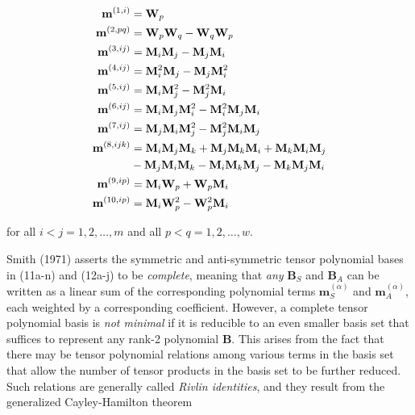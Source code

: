 %
\begin{subequations}
\begin{align}
	\label{E:29}
		\mathbf{m}^{(1,i)}  &= \mathbf{W}_p \\ 
		\mathbf{m}^{(2,pq)} &= \mathbf{W}_p \mathbf{W}_q - \mathbf{W}_q \mathbf{W}_p \\ 
		\mathbf{m}^{(3,ij)} &= \mathbf{M}_i \mathbf{M}_j - \mathbf{M}_j \mathbf{M}_i \\ 
		\mathbf{m}^{(4,ij)} &= \mathbf{M}^2_i \mathbf{M}_j - \mathbf{M}_j \mathbf{M}^2_i \\
		\mathbf{m}^{(5,ij)} &= \mathbf{M}_i \mathbf{M}^2_j - \mathbf{M}^2_j \mathbf{M}_i \\
		\mathbf{m}^{(6,ij)} &= \mathbf{M}_i \mathbf{M}_j \mathbf{M}^2_i  
							-  \mathbf{M}^2_i \mathbf{M}_j \mathbf{M}_i \\ 
		\mathbf{m}^{(7,ij)} &= \mathbf{M}_j \mathbf{M}_i \mathbf{M}^2_j  
							-  \mathbf{M}^2_j \mathbf{M}_i \mathbf{M}_j \\  
		\mathbf{m}^{(8,ijk)}&= \mathbf{M}_i \mathbf{M}_j \mathbf{M}_k 
							 + \mathbf{M}_j \mathbf{M}_k \mathbf{M}_i  
							 + \mathbf{M}_k \mathbf{M}_i \mathbf{M}_j \notag \\
							 &- \mathbf{M}_j \mathbf{M}_i \mathbf{M}_k 
							 - \mathbf{M}_i \mathbf{M}_k \mathbf{M}_j 
							 - \mathbf{M}_k \mathbf{M}_j \mathbf{M}_i \\
		\mathbf{m}^{(9,ip)} &= \mathbf{M}_i \mathbf{W}_p + \mathbf{W}_p \mathbf{M}_i   \\
		\mathbf{m}^{(10,ip)} &= \mathbf{M}_i \mathbf{W}^2_p-\mathbf{W}^2_p \mathbf{M}_i 
\end{align}
\end{subequations}	
%
%      
	 	
for all $i<j = 1,2,\ldots,m$   and all $p<q = 1,2,\ldots,w$.

Smith (1971) asserts the symmetric and anti-symmetric tensor polynomial bases in (11a-n) and (12a-j) to be \textit{complete}, meaning that \textit{any} $\mathbf{B}_S$  and $\mathbf{B}_A$ can be written as a linear sum of the corresponding polynomial terms  $\mathbf{m}^{(\alpha)}_S$ and $\mathbf{m}^{(\alpha)}_A$, each weighted by a corresponding coefficient. However, a complete tensor polynomial basis is \textit{not minimal} if it is reducible to an even smaller basis set that suffices to represent any rank-2 polynomial $\mathbf{B}$. This arises from the fact that there may be tensor polynomial relations among various terms in the basis set that allow the number of tensor products in the basis set to be further reduced. Such relations are generally called \textit{Rivlin identities}, and they result from the generalized Cayley-Hamilton theorem 


